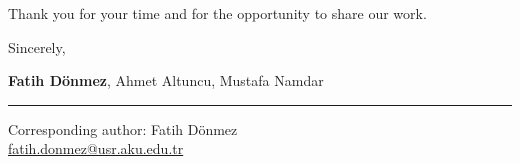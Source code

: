 \documentclass[11pt]{article}
\begin{document}
\vspace{15pt}
Thank you for your time and for the opportunity to share our work.

\vspace{30pt}
Sincerely,

\vspace{10pt}
\textbf{Fatih Dönmez}, Ahmet Altuncu, Mustafa Namdar\\
{\color{accentblue}\rule{\linewidth}{1.5pt}}

\vspace{8pt}
{\small\color{textgray}
Corresponding author: Fatih Dönmez\\
\href{mailto:fatih.donmez@usr.aku.edu.tr}{fatih.donmez@usr.aku.edu.tr}
}
\end{document}
